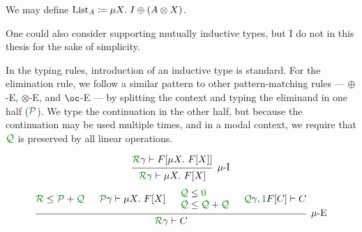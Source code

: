 \begin{example}
  We may define $\mathrm{List}_A \coloneqq \mu X.~I \oplus \plr{A \otimes X}$.
\end{example}

One could also consider supporting mutually inductive types, but I do not in
this thesis for the sake of simplicity.

In the typing rules, introduction of an inductive type is standard.
For the elimination rule, we follow a similar pattern to other pattern-matching
rules --- $\oplus$-E, $\otimes$-E, and $\oc$-E --- by splitting the context
and typing the eliminand in one half ($\grP$).
We type the continuation in the other half, but because the continuation may
be used multiple times, and in a modal context, we require that $\grQ$ is
preserved by all linear operations.

\begin{displaymath}
  \begin{prooftree}
    \hypo{\grR\gamma \vdash F[\mu X.~F[X]]}
    \infer1[$\mu$-I]{\grR\gamma \vdash \mu X.~F[X]}
  \end{prooftree}
\end{displaymath}
\begin{displaymath}
  \begin{prooftree}
    \hypo{\grR \leq \grP + \grQ}
    \hypo{\grP\gamma \vdash \mu X.~F[X]}
    \hypo{%
      \begin{matrix*}[l]
        \grQ \leq \gr0 \\
        \grQ \leq \grQ + \grQ
      \end{matrix*}%
    }
    \hypo{\grQ\gamma, \gr1F[C] \vdash C}
    \infer4[$\mu$-E]{\grR\gamma \vdash C}
  \end{prooftree}
\end{displaymath}

